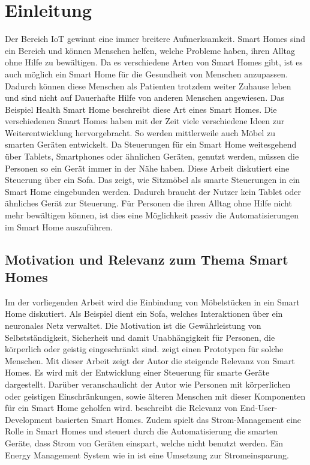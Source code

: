 \chapter{Einleitung}
\label{cha:Einleitung}
Der Bereich IoT gewinnt eine immer breitere Aufmerksamkeit. Smart Homes sind ein Bereich und können Menschen helfen, welche Probleme haben, ihren Alltag ohne Hilfe zu bewältigen. Da es verschiedene Arten von Smart Homes gibt, ist es auch möglich ein Smart Home für die Gesundheit von Menschen anzupassen. Dadurch können diese Menschen als Patienten trotzdem weiter Zuhause leben und sind nicht auf Dauerhafte Hilfe von anderen Menschen angewiesen. Das Beispiel Health Smart Home \citep{rialle2002health} beschreibt diese Art eines Smart Homes. Die verschiedenen Smart Homes haben mit der Zeit viele verschiedene Ideen zur Weiterentwicklung hervorgebracht. So werden mittlerweile auch Möbel zu smarten Geräten entwickelt.
\newline
\newline
Da Steuerungen für ein Smart Home weitesgehend über Tablets, Smartphones oder ähnlichen Geräten, genutzt werden, müssen die Personen so ein Gerät immer in der Nähe haben. Diese Arbeit diskutiert eine Steuerung über ein Sofa. Das zeigt, wie Sitzmöbel als smarte Steuerungen in ein Smart Home eingebunden werden. Dadurch braucht der Nutzer kein Tablet oder ähnliches Gerät zur Steuerung. Für Personen die ihren Alltag ohne Hilfe nicht mehr bewältigen können, ist dies eine Möglichkeit passiv die Automatisierungen im Smart Home auszuführen.

\section{Motivation und Relevanz zum Thema Smart Homes}
Im der vorliegenden Arbeit wird die Einbindung von Möbelstücken in ein Smart Home diskutiert. Als Beispiel dient ein Sofa, welches Interaktionen über ein neuronales Netz verwaltet. Die Motivation ist die Gewährleistung von Selbstständigkeit, Sicherheit und damit Unabhängigkeit für Personen, die körperlich oder geistig eingeschränkt sind. \citep{ramlee2012smart} zeigt einen Prototypen für solche Menschen. 
\newline
Mit dieser Arbeit zeigt der Autor die steigende Relevanz von Smart Homes. Es wird mit der Entwicklung einer Steuerung für smarte Geräte dargestellt. Darüber veranschaulicht der Autor wie Personen mit körperlichen oder geistigen Einschränkungen, sowie älteren Menschen mit dieser Komponenten für ein Smart Home geholfen wird. \citep{demeure2014activity} beschreibt die Relevanz von End-User-Development basierten Smart Homes. Zudem spielt das Strom-Management eine Rolle in Smart Homes und steuert durch die Automatisierung die smarten Geräte, dass Strom von Geräten einspart, welche nicht benutzt werden. Ein Energy Management System wie in \citep{al2017smart} ist eine Umsetzung zur Stromeinsparung.

